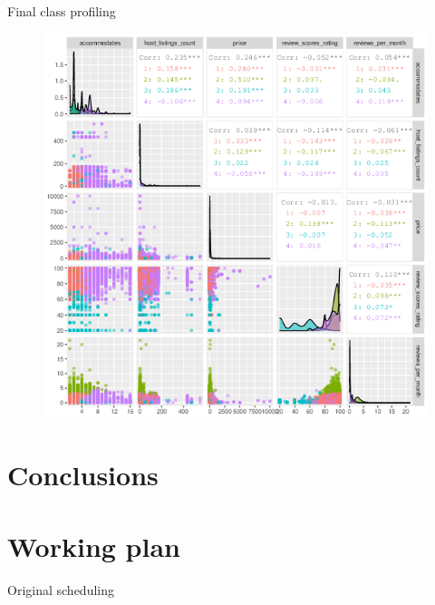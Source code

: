 \begin{frame}{Final class profiling}
\begin{figure}[H]
\centering
\includegraphics[height=0.9\textheight]{pairs.png}
\end{figure}
\end{frame}


\section{Conclusions}

\section{Working plan}
\begin{frame}{Original scheduling}
\centering
\vspace{1.4em}
\scalebox{0.25}{%

}
\end{frame}

